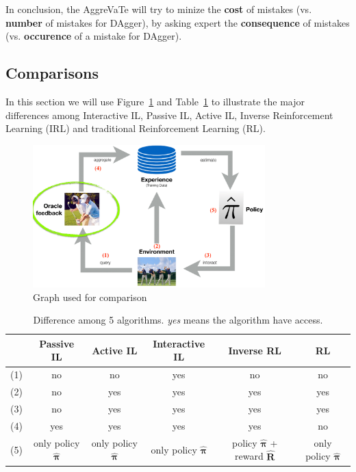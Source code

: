 \documentclass[11pt]{article}
\begin{document}
In conclusion, the AggreVaTe will try to minize the \textbf{cost} of mistakes (vs. \textbf{number} of mistakes for DAgger), by asking expert the \textbf{consequence} of mistakes (vs. \textbf{occurence} of a mistake for DAgger).


\subsection{Comparisons}
In this section we will use Figure~\ref{fig:comp} and Table~\ref{tab:comp} to illustrate the major differences among Interactive IL, Passive IL, Active IL, Inverse Reinforcement Learning (IRL) and traditional Reinforcement Learning (RL). 

\begin{figure}[H]
\centering
\includegraphics[width=0.8\textwidth]{comparison.png}
\caption{Graph used for comparison}
\label{fig:comp}
\end{figure}

\begin{table}[H]
\centering
\begin{tabular}{|c|c|c|c|c|c|}
\hline & Passive IL & Active IL & Interactive IL & Inverse RL & RL \\
\hline (1)  & no & no & yes & no & no\\
\hline (2)  & no & yes & yes & yes & yes\\
\hline (3)  & no & yes & yes & yes & yes \\
\hline (4)  & yes & yes & yes & yes & no\\
\hline (5)  & only policy $\hat{\mathbf{\pi}}$ & only policy $\hat{\mathbf{\pi}}$ & only policy $\hat{\mathbf{\pi}}$ & policy $\hat{\mathbf{\pi}}$ + reward $\hat{\mathbf{R}}$&only policy $\hat{\mathbf{\pi}}$\\
\hline
\end{tabular}
\caption{Difference among 5 algorithms. \textit{yes} means the algorithm have access.}
\label{tab:comp}
\end{table}
\end{document}
